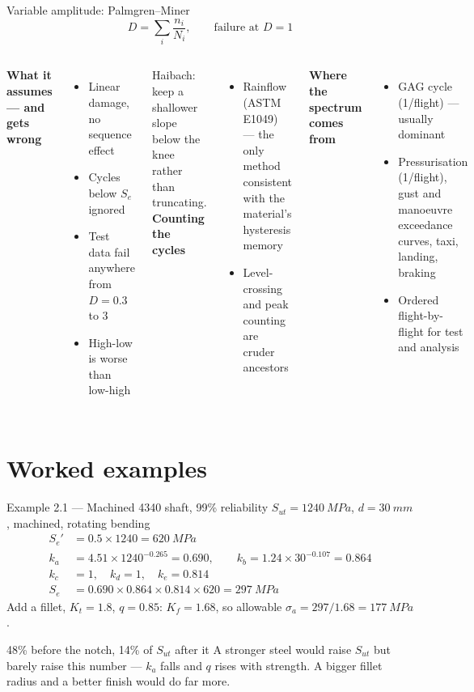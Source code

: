 \documentclass[aspectratio=169,10pt]{beamer}
\begin{document}
\begin{frame}{Variable amplitude: Palmgren--Miner}
\footnotesize
\[
D=\sum_i\frac{n_i}{N_i},\qquad \text{failure at } D=1
\]
\begin{columns}[T]
\textbf{What it assumes --- and gets wrong}
\begin{itemize}
  \item Linear damage, no sequence effect
  \item Cycles below $S_e$ ignored
  \item Test data fail anywhere from $D=0.3$ to $3$
  \item High-low is worse than low-high
\end{itemize}
Haibach: keep a shallower slope below the knee rather than truncating.
\textbf{Counting the cycles}
\begin{itemize}
  \item \alert{Rainflow} (ASTM E1049) --- the only method consistent with the material's hysteresis memory
  \item Level-crossing and peak counting are cruder ancestors
\end{itemize}
\textbf{Where the spectrum comes from}
\begin{itemize}\footnotesize
  \item GAG cycle (1/flight) --- usually dominant
  \item Pressurisation (1/flight), gust and manoeuvre exceedance curves, taxi, landing, braking
  \item Ordered flight-by-flight for test and analysis
\end{itemize}
\end{columns}
\end{frame}

\section{Worked examples}

\begin{frame}{Example 2.1 --- Machined 4340 shaft, 99\% reliability}
$S_{ut}=\SI{1240}{MPa}$, $d=\SI{30}{mm}$, machined, rotating bending
\begin{align*}
S_e' &= 0.5\times1240=\SI{620}{MPa}\\
k_a &= 4.51\times1240^{-0.265}=0.690,\qquad k_b=1.24\times30^{-0.107}=0.864\\
k_c &= 1,\quad k_d=1,\quad k_e=0.814\\
S_e &= 0.690\times0.864\times0.814\times620=\SI{297}{MPa}
\end{align*}
Add a fillet, $K_t=1.8$, $q=0.85$: $K_f=1.68$, so allowable $\sigma_a=297/1.68=\SI{177}{MPa}$.
\begin{alertblock}{48\% before the notch, 14\% of $S_{ut}$ after it}
A stronger steel would raise $S_{ut}$ but barely raise this number --- $k_a$ falls and $q$ rises with strength. A bigger fillet radius and a better finish would do far more.
\end{alertblock}
\end{frame}
\end{document}
